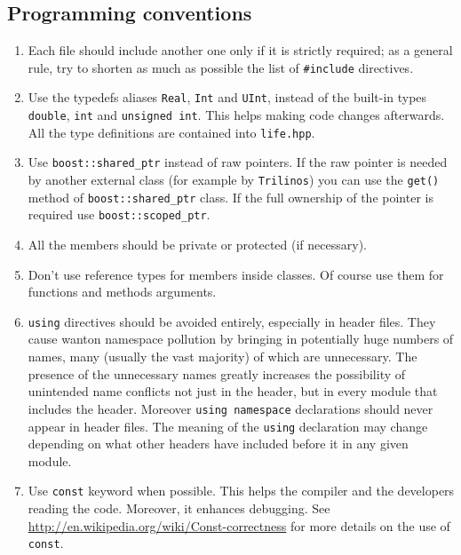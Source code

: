 \documentclass[10p]{article}
\begin{document}
\subsection{Programming conventions}
\begin{enumerate}
  \item Each file should include another one only if it is strictly required; as a general rule, try to shorten as much as possible the list of \texttt{\#include} directives.
  \item Use the typedefs aliases \texttt{Real}, \texttt{Int} and \texttt{UInt}, instead of the built-in types \texttt{double}, \texttt{int} and \texttt{unsigned int}. This helps making code changes afterwards. All the type definitions are contained into \texttt{life.hpp}. %
  \item Use \texttt{boost::shared\_ptr} instead of raw pointers. If the raw pointer is needed by another external class (for example by \texttt{Trilinos}) you can use the \texttt{get()} method of \texttt{boost::shared\_ptr} class. If the full ownership of the pointer is required use \texttt{boost::scoped\_ptr}.
  \item All the members should be private or protected (if necessary).
  \item Don't use reference types for members inside classes. Of course use them for functions and methods arguments.
  \item \texttt{using} directives should be avoided entirely, especially in header files. They cause wanton namespace pollution by bringing in potentially huge numbers of names, many (usually the vast majority) of which are unnecessary. The presence of the unnecessary names greatly increases the possibility of unintended name conflicts not just in the header, but in every module that includes the header. Moreover
  \texttt{using namespace} declarations should never appear in header files. The meaning of the \texttt{using} declaration may change depending on what other headers have included before it in any given module.
  \item Use \texttt{const} keyword when possible. This helps the compiler and the developers reading the code. Moreover, it enhances debugging. See \url{http://en.wikipedia.org/wiki/Const-correctness} for more details on the use of \texttt{const}.

\end{enumerate}
\end{document}
